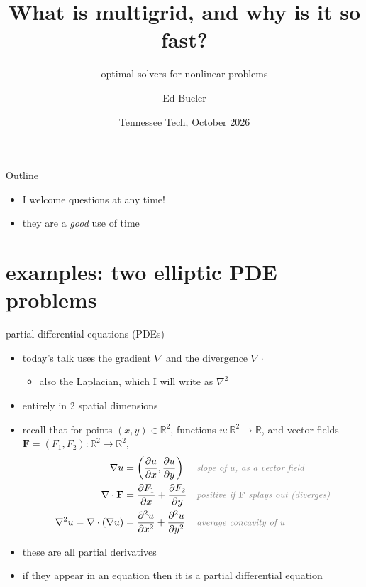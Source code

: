 \documentclass[10pt,
               svgnames,
               hyperref={colorlinks,citecolor=DeepPink4,linkcolor=FireBrick,urlcolor=Maroon},
               usepdftitle=false]{beamer}
\title[Multigrid for nonlinear problems]{What is multigrid, and why is it so fast?}
\subtitle{optimal solvers for nonlinear problems}
\author{Ed Bueler}
\institute[]{University of Alaska Fairbanks}
\date[{\color{gray} Tennessee Tech}]{{\color{gray} Tennessee Tech, October 2026}}
\newcommand{\bF}{\mathbf{F}}
\newcommand{\RR}{\mathbb{R}}
\newcommand{\grad}{\nabla}
\newcommand{\Div}{\nabla \cdot}
\begin{document}
\beamertemplatenavigationsymbolsempty

\begin{frame}
  \maketitle
\end{frame}

\begin{frame}{Outline}
  \tableofcontents[hideallsubsections]
\end{frame}


\begin{frame}

\Large
\begin{itemize}
\item I welcome questions at any time!

\bigskip
\item they are a \emph{good} use of time
\end{itemize}
\end{frame}


\section{examples: two elliptic PDE problems}

\newcommand{\st}[1]{\small \text{\color {gray} \emph{#1}}}

\begin{frame}{partial differential equations (PDEs)}

\begin{itemize}
\item today's talk uses the \alert{gradient} $\grad$ and the \alert{divergence} $\grad\cdot$
	\begin{itemize}
	\item[$\circ$] also the \alert{Laplacian}, which I will write as $\grad^2$
	\end{itemize}
\item entirely in 2 spatial dimensions

\medskip
\item recall that for points $(x,y)\in\RR^2$, functions $u:\RR^2 \to \RR$, and vector fields $\bF=(F_1,F_2) : \RR^2 \to \RR^2$,
\begin{align*}
\grad u &= \left(\frac{\partial u}{\partial x}, \frac{\partial u}{\partial y}\right) && \st{slope of $u$, as a vector field} \\
\Div\bF &= \frac{\partial F_1}{\partial x} + \frac{\partial F_2}{\partial y} && \st{positive if $\bF$~splays out (diverges)} \\
\grad^2 u = \Div(\grad u) &= \frac{\partial^2 u}{\partial x^2} + \frac{\partial^2 u}{\partial y^2} && \st{average concavity of $u$}
\end{align*}

\medskip
\item these are all partial derivatives
\item if they appear in an equation then it is a \alert{partial differential equation}
\end{itemize}
\end{frame}
\end{document}
